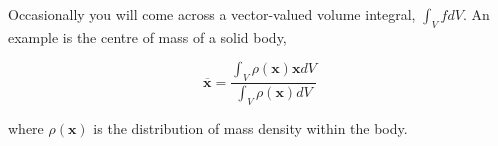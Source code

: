 \begin{remark}
  Occasionally you will come across a vector-valued volume integral, \(\int_V f d V\).
An example is the centre of mass of a solid body,

\[
\overline{\boldsymbol{x}}=\frac{\int_V \rho(\boldsymbol{x}) \boldsymbol{x} d V}{\int_V \rho(\boldsymbol{x}) d V}
\]

where \(\rho(\boldsymbol{x})\) is the distribution of mass density within the body.
\end{remark}

